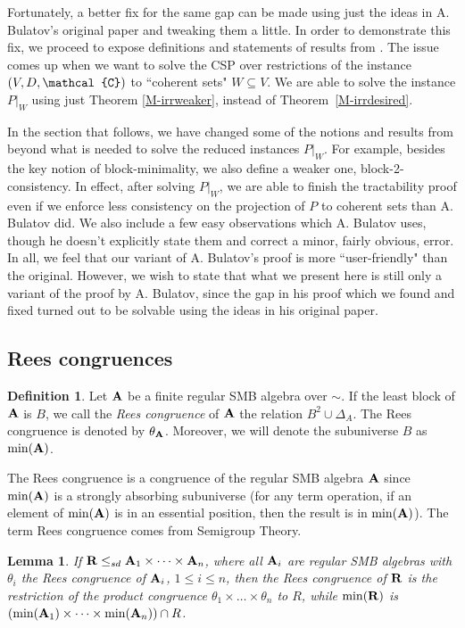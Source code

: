 \documentclass[11pt]{amsart}
\newcommand{\m}[1]{{\uppercase {\mathbf {#1}}}}
\newcommand{\vr}[1]{{\uppercase {\mathcal{#1}}}}
\newtheorem{lm}[thm]{Lemma}
\theoremstyle{definition}
\newtheorem{df}[thm]{Definition}
\begin{document}
Fortunately, a better fix for the same gap can be made using just the ideas in A. Bulatov's original paper \cite{BuSMB} and tweaking them a little. In order to demonstrate this fix, we proceed to expose definitions and statements of results from \cite{BuSMB}. The issue comes up when we want to solve the CSP over restrictions of the instance $(V,D,\vr c)$ to ``coherent sets" $W\subseteq V$. We are able to solve the instance $P|_W$ using just Theorem \ref{M-irrweaker}, instead of Theorem~\ref{M-irrdesired}.

In the section that follows, we have changed some of the notions and results from \cite{BuSMB} beyond what is needed to solve the reduced instances $P|_W$. For example, besides the key notion of block-minimality, we also define a weaker one, block-2-consistency. In effect, after solving $P|_W$, we are able to finish the tractability proof even if we enforce less consistency on the projection of $P$ to coherent sets than A. Bulatov did. We also include a few easy observations which A. Bulatov uses, though he doesn't explicitly state them and correct a minor, fairly obvious, error. In all, we feel that our variant of A. Bulatov's proof is more ``user-friendly" than the original. However, we wish to state that what we present here is still only a variant of the proof by A. Bulatov, since the gap in his proof which we found and fixed turned out to be solvable using the ideas in his original paper.

\subsection{Rees congruences}

\begin{df}
Let $\m a$ be a finite regular SMB algebra over $\sim$. If the least block of $\m a$ is $B$, we call the {\em Rees congruence} of $\m a$ the relation $B^2\cup\Delta_A$. The Rees congruence is denoted by $\theta_{\m A}$. Moreover, we will denote the subuniverse $B$ as $\mathrm{min}(\m a)$.
\end{df}

The Rees congruence is a congruence of the regular SMB algebra $\m a$ since $\mathrm{min}(\m a)$ is a strongly absorbing subuniverse (for any term operation, if an element of $\mathrm{min}(\m a)$ is in an essential position, then the result is in $\mathrm{min}(\m a)$). The term Rees congruence comes from Semigroup Theory.

\begin{lm}\label{minR}
If $\m R\leq_{sd}\m a_1\times\dots\times\m a_n$, where all $\m a_i$ are regular SMB algebras with $\theta_i$ the Rees congruence of $\m a_i$, $1\leq i\leq n$, then the Rees congruence of $\m r$ is the restriction of the product congruence $\theta_1\times\dots\times\theta_n$ to $R$, while $\mathrm{min}(\m r)$ is $(\mathrm{min}(\m a_1)\times\dots\times\mathrm{min}(\m a_n))\cap R$.
\end{lm}
\end{document}

